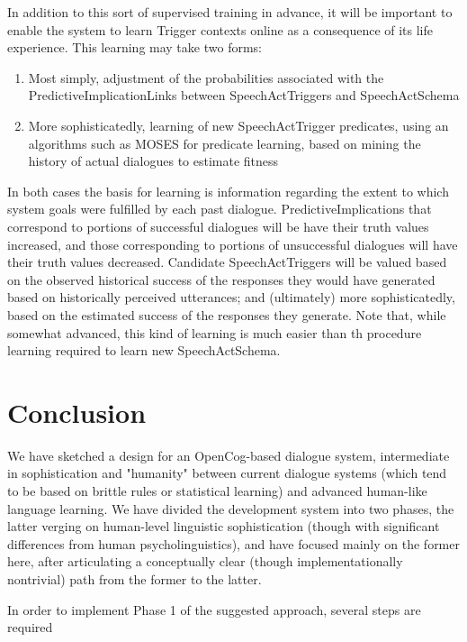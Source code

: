 \documentclass[10pt]{article}
\begin{document}
In addition to this sort of supervised training in advance, it will be important to enable the system to learn Trigger contexts online as a consequence of its life experience.  This learning may take two forms:

\begin{enumerate}
\item Most simply, adjustment of the probabilities associated with the PredictiveImplicationLinks between SpeechActTriggers and SpeechActSchema
\item More sophisticatedly, learning of new SpeechActTrigger predicates, using an algorithms such as MOSES for predicate learning, based on mining the history of actual dialogues to estimate fitness
\end{enumerate}

\noindent In both cases the basis for learning is information regarding the extent to which system goals were fulfilled by each past dialogue.  PredictiveImplications that correspond to portions of successful dialogues will be have their  truth values increased, and those corresponding to portions of unsuccessful dialogues will have their truth values decreased.   Candidate SpeechActTriggers will be valued based on the observed historical success of the responses they would have generated based on historically perceived utterances; and (ultimately) more sophisticatedly, based on the estimated success of the responses they generate.  Note that, while somewhat advanced, this kind of learning is much easier than th procedure learning required to learn new SpeechActSchema.

\section{Conclusion}

We have sketched a design for an OpenCog-based dialogue system, intermediate in sophistication and "humanity" between current dialogue systems (which tend to be based on brittle rules or statistical learning) and advanced human-like language learning.  We have divided the development system into two phases, the latter verging on human-level linguistic sophistication (though with significant differences from human psycholinguistics), and have focused mainly on the former here, after articulating a conceptually clear (though implementationally nontrivial) path from the former to the latter.

In order to implement Phase 1 of the suggested approach, several steps are required
\end{document}
